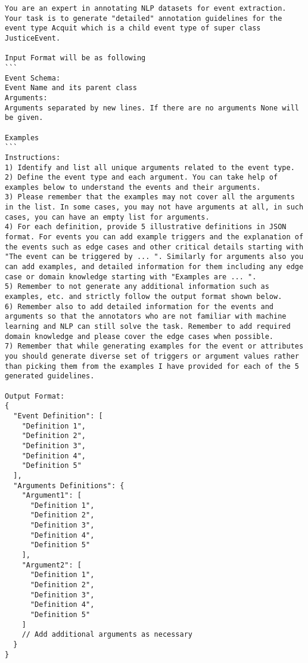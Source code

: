 \begin{lstlisting}[style=customjson, caption={Prompt example for generating Guideline-P, Guideline-PN, and Guideline-PS.}, label={lst:guidelines1}, aboveskip=10pt, belowskip=10pt]
You are an expert in annotating NLP datasets for event extraction. Your task is to generate "detailed" annotation guidelines for the event type Acquit which is a child event type of super class JusticeEvent.

Input Format will be as following
```
Event Schema:
Event Name and its parent class
Arguments:
Arguments separated by new lines. If there are no arguments None will be given.

Examples
```
Instructions:
1) Identify and list all unique arguments related to the event type.
2) Define the event type and each argument. You can take help of examples below to understand the events and their arguments. 
3) Please remember that the examples may not cover all the arguments in the list. In some cases, you may not have arguments at all, in such cases, you can have an empty list for arguments. 
4) For each definition, provide 5 illustrative definitions in JSON format. For events you can add example triggers and the explanation of the events such as edge cases and other critical details starting with "The event can be triggered by ... ". Similarly for arguments also you can add examples, and detailed information for them including any edge case or domain knowledge starting with "Examples are ... ".
5) Remember to not generate any additional information such as examples, etc. and strictly follow the output format shown below.
6) Remember also to add detailed information for the events and arguments so that the annotators who are not familiar with machine learning and NLP can still solve the task. Remember to add required domain knowledge and please cover the edge cases when possible.
7) Remember that while generating examples for the event or attributes you should generate diverse set of triggers or argument values rather than picking them from the examples I have provided for each of the 5 generated guidelines.

Output Format:
{
  "Event Definition": [
    "Definition 1",
    "Definition 2",
    "Definition 3",
    "Definition 4",
    "Definition 5"
  ],
  "Arguments Definitions": {
    "Argument1": [
      "Definition 1",
      "Definition 2",
      "Definition 3",
      "Definition 4",
      "Definition 5"
    ],
    "Argument2": [
      "Definition 1",
      "Definition 2",
      "Definition 3",
      "Definition 4",
      "Definition 5"
    ]
    // Add additional arguments as necessary
  }
}


\end{lstlisting}
